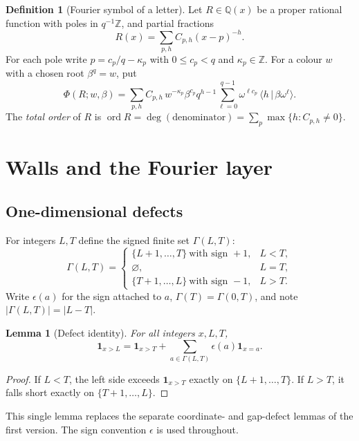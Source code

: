 \documentclass[11pt]{amsart}
\newtheorem{lemma}[theorem]{Lemma}
\theoremstyle{definition}
\newtheorem{definition}[theorem]{Definition}
\theoremstyle{remark}
\numberwithin{equation}{section}
\newcommand{\Z}{\mathbb{Z}}
\newcommand{\Q}{\mathbb{Q}}
\newcommand{\one}{\mathbf{1}}
\begin{document}
\begin{definition}[Fourier symbol of a letter]\label{def:Phi}
Let $R\in\Q(x)$ be a proper rational function with poles in $q^{-1}\Z$, and partial fractions
\[
R(x)=\sum_{p,h}C_{p,h}(x-p)^{-h}.
\]
For each pole write $p=c_p/q-\kappa_p$ with $0\le c_p<q$ and $\kappa_p\in\Z$. For a colour $w$ with a chosen root $\beta^q=w$, put
\begin{equation}\label{eq:Phi}
\Phi(R;w,\beta)=\sum_{p,h}C_{p,h}\,w^{-\kappa_p}\beta^{c_p}q^{h-1}\sum_{\ell=0}^{q-1}\omega^{\ell c_p}\,\langle h\,|\,\beta\omega^\ell\rangle .
\end{equation}
The \emph{total order} of $R$ is $\operatorname{ord}R=\deg(\text{denominator})=\sum_p\max\{h:C_{p,h}\ne0\}$.
\end{definition}

\section{Walls and the Fourier layer}\label{sec:walls}

\subsection{One-dimensional defects}
For integers $L,T$ define the signed finite set $\Gamma(L,T)$:
\[
\Gamma(L,T)=\begin{cases}\{L+1,\dots,T\}\ \text{with sign } +1,& L<T,\\ \varnothing,& L=T,\\ \{T+1,\dots,L\}\ \text{with sign } -1,& L>T.\end{cases}
\]
Write $\epsilon(a)$ for the sign attached to $a$, $\Gamma(T)=\Gamma(0,T)$, and note $|\Gamma(L,T)|=|L-T|$.

\begin{lemma}[Defect identity]\label{lem:defect}
For all integers $x,L,T$,
\[
\one_{x>L}=\one_{x>T}+\sum_{a\in\Gamma(L,T)}\epsilon(a)\one_{x=a}.
\]
\end{lemma}
\begin{proof}
If $L<T$, the left side exceeds $\one_{x>T}$ exactly on $\{L+1,\dots,T\}$. If $L>T$, it falls short exactly on $\{T+1,\dots,L\}$.
\end{proof}

This single lemma replaces the separate coordinate- and gap-defect lemmas of the first version. The sign convention $\epsilon$ is used throughout.
\end{document}
